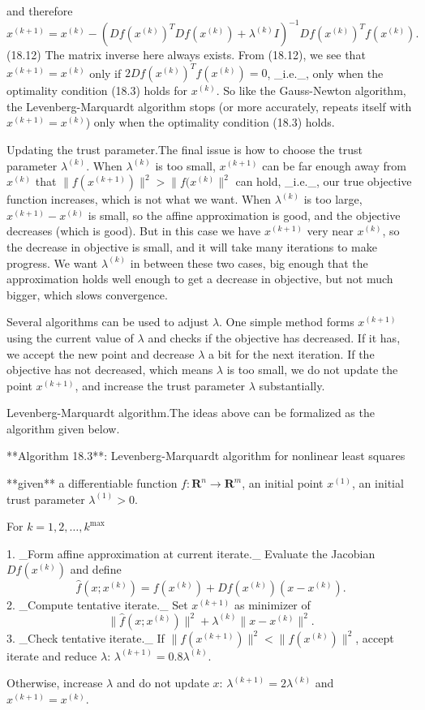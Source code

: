 and therefore \[x^{(k+1)}=x^{(k)}-\left(Df(x^{(k)})^{T}Df(x^{(k)})+\lambda^{(k)}I\right)^{-1}Df(x^ {(k)})^{T}f(x^{(k)}).\] (18.12) The matrix inverse here always exists. From (18.12), we see that \(x^{(k+1)}=x^{(k)}\) only if \(2Df(x^{(k)})^{T}f(x^{(k)})=0\), _i.e._, only when the optimality condition (18.3) holds for \(x^{(k)}\). So like the Gauss-Newton algorithm, the Levenberg-Marquardt algorithm stops (or more accurately, repeats itself with \(x^{(k+1)}=x^{(k)}\)) only when the optimality condition (18.3) holds.

Updating the trust parameter.The final issue is how to choose the trust parameter \(\lambda^{(k)}\). When \(\lambda^{(k)}\) is too small, \(x^{(k+1)}\) can be far enough away from \(x^{(k)}\) that \(\|f(x^{(k+1)})\|^{2}>\|f(x^{(k)}\|^{2}\) can hold, _i.e._, our true objective function increases, which is not what we want. When \(\lambda^{(k)}\) is too large, \(x^{(k+1)}-x^{(k)}\) is small, so the affine approximation is good, and the objective decreases (which is good). But in this case we have \(x^{(k+1)}\) very near \(x^{(k)}\), so the decrease in objective is small, and it will take many iterations to make progress. We want \(\lambda^{(k)}\) in between these two cases, big enough that the approximation holds well enough to get a decrease in objective, but not much bigger, which slows convergence.

Several algorithms can be used to adjust \(\lambda\). One simple method forms \(x^{(k+1)}\) using the current value of \(\lambda\) and checks if the objective has decreased. If it has, we accept the new point and decrease \(\lambda\) a bit for the next iteration. If the objective has not decreased, which means \(\lambda\) is too small, we do not update the point \(x^{(k+1)}\), and increase the trust parameter \(\lambda\) substantially.

Levenberg-Marquardt algorithm.The ideas above can be formalized as the algorithm given below.

**Algorithm 18.3**: Levenberg-Marquardt algorithm for nonlinear least squares

**given** a differentiable function \(f:\mathbf{R}^{n}\to\mathbf{R}^{m}\), an initial point \(x^{(1)}\), an initial trust parameter \(\lambda^{(1)}>0\).

For \(k=1,2,\ldots,k^{\max}\)

1. _Form affine approximation at current iterate._ Evaluate the Jacobian \(Df(x^{(k)})\) and define \[\hat{f}(x;x^{(k)})=f(x^{(k)})+Df(x^{(k)})(x-x^{(k)}).\]
2. _Compute tentative iterate._ Set \(x^{(k+1)}\) as minimizer of \[\|\hat{f}(x;x^{(k)})\|^{2}+\lambda^{(k)}\|x-x^{(k)}\|^{2}.\]
3. _Check tentative iterate._ If \(\|f(x^{(k+1)})\|^{2}<\|f(x^{(k)})\|^{2}\), accept iterate and reduce \(\lambda\): \(\lambda^{(k+1)}=0.8\lambda^{(k)}\).

Otherwise, increase \(\lambda\) and do not update \(x\): \(\lambda^{(k+1)}=2\lambda^{(k)}\) and \(x^{(k+1)}=x^{(k)}\).

 